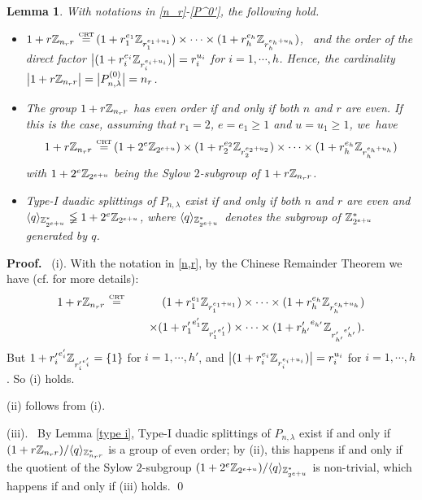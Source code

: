 \documentclass{article}
\newtheorem{Lemma}[Theorem]{Lemma}
\numberwithin{equation}{section}
\numberwithin{table}{section}
\def\Z{{\Bbb Z}}
\def\pf{\par{\bf Proof.}~ }
\def\CRT{\,\mathop{=}\limits^{\mbox{\rm\tiny CRT}}\,}
\begin{document}
\begin{Lemma}\label{group n_r}
With notations in \eqref{n_r}-\eqref{P^0'}, the following hold.
\begin{itemize}
\item[(i)]
$1+r\Z_{n_r r}\CRT (1+r_1^{e_1}\Z_{r_1^{e_1+u_1}})\times\cdots
\times(1+r_h^{e_h}\Z_{r_h^{e_h+u_h}})$,~
and the order of the direct factor
$\big|(1+r_i^{e_i}\Z_{r_i^{e_i+u_i}})\big|=r_i^{u_i}$
for $i=1,\cdots,h$. Hence, the cardinality
$\big|1+r\Z_{n_r r}\big|=\big|P_{n,\lambda}^{(0)}\big|=n_r$.
\item[(ii)]
The group $1+r\Z_{n_r r}$ has even order if and only if
both $n$ and $r$ are even. If this is the case, assuming that
$r_1=2$, $e=e_1\ge 1$ and $u=u_1\ge 1$, we~have
$$1+r\Z_{n_r r}\CRT (1+2^{e}\Z_{2^{e+u}})\times
(1+r_2^{e_2}\Z_{r_2^{e_2+u_2}})\times\cdots
\times(1+r_h^{e_h}\Z_{r_h^{e_h+u_h}})$$
with $1+2^{e}\Z_{2^{e+u}}$ being the Sylow $2$-subgroup of $1+r\Z_{n_r r}$.
\item[(iii)]
Type-I duadic splittings of $P_{n,\lambda}$ exist if and only if
both $n$ and $r$ are even and
 $\langle q\rangle_{\Z_{2^{e+u}}^*}\lneqq
   1+2^e\Z_{2^{e+u}}$, where $\langle q\rangle_{\Z_{2^{e+u}}^*}$
denotes the subgroup of $\Z_{2^{e+u}}^*$ generated by $q$.
\end{itemize}
\end{Lemma}

\pf (i). With the notation in \eqref{n,r}, by the Chinese Remainder Theorem
we have (cf. \cite[eq.(IV.3)]{CDFL} for more details):
\begin{eqnarray*}
1+r\Z_{n_r r}&\CRT& (1+r_1^{e_1}\Z_{r_1^{e_1+u_1}})\times\cdots
\times(1+r_h^{e_h}\Z_{r_h^{e_h+u_h}})\\
&&\quad\times (1+{r'_1}^{e'_1}\Z_{{r'_1}^{e'_1}})\times\cdots
\times(1+{r'_{h'}}^{e_{h'}}\Z_{{r'_{h'}}^{e'_{h'}}}).
\end{eqnarray*}
But $1+{r'_i}^{e'_i}\Z_{{r'_i}^{e'_i}}=\{1\}$ for $i=1,\cdots,h'$,
and $\big|(1+r_i^{e_i}\Z_{r_i^{e_i+u_i}})\big|=r_i^{u_i}$ for $i=1,\cdots,h$.
So (i) holds.

(ii) follows from (i).

(iii).~ By Lemma \ref{type i},
Type-I duadic splittings of $P_{n,\lambda}$ exist if and only if
$(1+r\Z_{n_r r})/\langle q\rangle_{\Z_{n_r r}^*}$ is a group of even order;
 by (ii), this happens if and only if the quotient of the Sylow $2$-subgroup
 $(1+2^e\Z_{2^{e+u}})/\langle q\rangle_{\Z_{2^{e+u}}^*}$
 is non-trivial, which happens if and only if (iii) holds.
\qed
\end{document}
